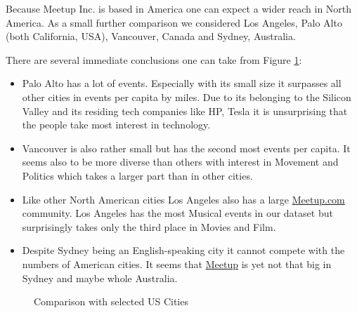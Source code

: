 Because Meetup Inc. is based in America one can expect a wider reach in North America. As a small further comparison we considered Los Angeles, Palo Alto (both California, USA), Vancouver, Canada and Sydney, Australia. 

There are several immediate conclusions one can take from Figure \ref{fig:usabar}:
\begin{itemize}
	\item Palo Alto has a lot of events. Especially with its small size it surpasses all other cities in events per capita by miles. Due to its belonging to the Silicon Valley and its residing tech companies like HP, Tesla it is unsurprising that the people take most interest in technology. 
	\item Vancouver is also rather small but has the second most events per capita. It seems also to be more diverse than others with interest in Movement and Politics which takes a larger part than in other cities. 
	\item Like other North American cities Los Angeles also has a large \url{Meetup.com} community. Los Angeles has the most Musical events in our dataset but surprisingly takes only the third place in Movies and Film.
	\item Despite Sydney being an English-speaking city it cannot compete with the numbers of American cities. It seems that \url{Meetup} is yet not that big in Sydney and maybe whole Australia. 
\end{itemize}
\begin{figure}[!htp]
	\hfill
	\caption{Comparison with selected US Cities}\label{fig:usabar}
\end{figure}